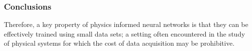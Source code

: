\documentclass{beamer}
\begin{document}

\begin{frame}
    \frametitle{Conclusions}
    
Therefore, a key property of physics informed neural networks is that they can be effectively trained using small data sets; a setting often encountered in the study of physical systems for which the cost of data acquisition may be prohibitive.

\end{frame}




\end{document}
